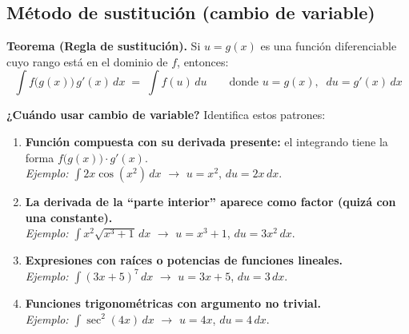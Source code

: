 \documentclass[12pt, letterpaper]{article}
\newcommand{\dx}{\,dx}
\newcommand{\du}{\,du}
\begin{document}
\vspace{6pt}

\subsection{Método de sustitución (cambio de variable)}

\begin{cuadrosolucion}
\textbf{Teorema (Regla de sustitución).}\quad
Si $u = g(x)$ es una función diferenciable cuyo rango está en el dominio de $f$, entonces:
\[
  \int f\!\bigl(g(x)\bigr)\,g'(x)\dx \;=\; \int f(u)\du
  \qquad\text{donde } u = g(x),\;\; du = g'(x)\dx
\]
\end{cuadrosolucion}

\vspace{4pt}

\begin{cuadroadvertencia}
\small\textbf{¿Cuándo usar cambio de variable?}\; Identifica estos patrones:
\begin{enumerate}[leftmargin=*, itemsep=3pt]
  \item \textbf{Función compuesta con su derivada presente:} el integrando tiene la forma
        $f\bigl(g(x)\bigr)\cdot g'(x)$.\\
        \textit{Ejemplo:} $\int 2x\cos(x^2)\dx$ \;\;$\longrightarrow$\;\; $u = x^2$, $du = 2x\dx$.
  \item \textbf{La derivada de la ``parte interior'' aparece como factor (quizá con una constante).}\\
        \textit{Ejemplo:} $\int x^2\sqrt{x^3+1}\dx$ \;\;$\longrightarrow$\;\; $u = x^3+1$, $du = 3x^2\dx$.
  \item \textbf{Expresiones con raíces o potencias de funciones lineales.}\\
        \textit{Ejemplo:} $\int (3x+5)^7\dx$ \;\;$\longrightarrow$\;\; $u = 3x+5$, $du = 3\dx$.
  \item \textbf{Funciones trigonométricas con argumento no trivial.}\\
        \textit{Ejemplo:} $\int \sec^2(4x)\dx$ \;\;$\longrightarrow$\;\; $u = 4x$, $du = 4\dx$.
\end{enumerate}
\end{cuadroadvertencia}

\vspace{4pt}
\end{document}
